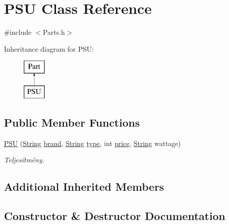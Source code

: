 \hypertarget{class_p_s_u}{}\section{P\+SU Class Reference}
\label{class_p_s_u}


{\ttfamily \#include $<$Parts.\+h$>$}

Inheritance diagram for P\+SU\+:\begin{figure}[H]
\begin{center}
\leavevmode
\includegraphics[height=2.000000cm]{class_p_s_u}
\end{center}
\end{figure}
\subsection*{Public Member Functions}
\begin{DoxyCompactItemize}
\item 
\mbox{\hyperlink{class_p_s_u_a11ff8451c8cb51e61875fafb628e9f94}{P\+SU}} (\mbox{\hyperlink{class_string}{String}} \mbox{\hyperlink{class_part_ae06f2fdeb7fbbdb229a7aca151f3e341}{brand}}, \mbox{\hyperlink{class_string}{String}} \mbox{\hyperlink{class_part_a101dbcc5c4b21564df7414c7eb0eae88}{type}}, int \mbox{\hyperlink{class_part_a8e71223aed1da95a974f33d8d6c91bb1}{price}}, \mbox{\hyperlink{class_string}{String}} wattage)
\begin{DoxyCompactList}\small\item\em Teljesítmény. \end{DoxyCompactList}\end{DoxyCompactItemize}
\subsection*{Additional Inherited Members}


\subsection{Constructor \& Destructor Documentation}
\mbox{\label{class_p_s_u_a11ff8451c8cb51e61875fafb628e9f94}} 
